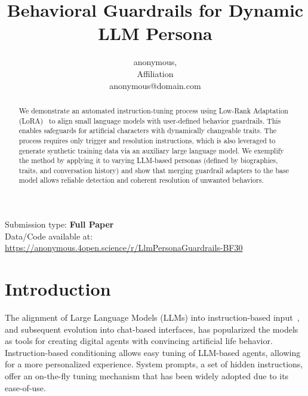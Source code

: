 \documentclass[letterpaper]{article}
\title{Behavioral Guardrails for Dynamic LLM Persona}
\author{
    anonymous, 
    \mbox{}\\
    Affiliation \\ 
    anonymous@domain.com
} %
\begin{document}
\maketitle

\begin{abstract}
    We demonstrate an automated instruction-tuning process using Low-Rank Adaptation (LoRA)~\cite{hu2021lora} to align small language models with user-defined behavior guardrails. This enables safeguards for artificial characters with dynamically changeable traits. The process requires only trigger and resolution instructions, which is also leveraged to generate synthetic training data via an auxiliary large language model. We exemplify the method by applying it to varying LLM-based personas (defined by biographies, traits, and conversation history) and show that merging guardrail adapters to the base model allows reliable detection and coherent resolution of unwanted behaviors.
\end{abstract}


Submission type: \textbf{Full Paper}\\

Data/Code available at: \url{https://anonymous.4open.science/r/LlmPersonaGuardrails-BF30}

\section{Introduction}
The alignment of Large Language Models (LLMs) into instruction-based input~\cite{ouyang2022training}, and subsequent evolution into chat-based interfaces, has popularized the models as tools for creating digital agents with convincing artificial life behavior. Instruction-based conditioning allows easy tuning of LLM-based agents, allowing for a more personalized experience. System prompts, a set of hidden instructions, offer an on-the-fly tuning mechanism that has been widely adopted due to its ease-of-use.
\end{document}
